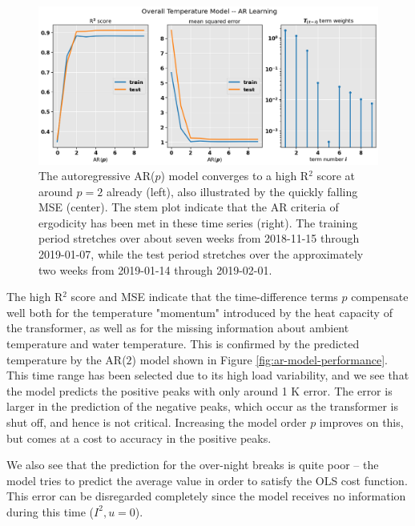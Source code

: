 \documentclass[]{article}
\begin{document}
\begin{figure}[!h]
	\centering
	\includegraphics[width=1\linewidth]{./figs/ar-model-learning.png}
	\caption{The autoregressive AR($p$) model converges to a high R$^2$ score at around $p = 2$ already (left), also illustrated by the quickly falling MSE (center). The stem plot indicate that the AR criteria of ergodicity has been met in these time series (right). The training period stretches over about seven weeks from 2018-11-15 through 2019-01-07, while the test period stretches over the approximately two weeks from 2019-01-14 through 2019-02-01.}
	\label{fig:ar-model-learning}
\end{figure}

The high R$^2$ score and MSE indicate that the time-difference terms $p$ compensate well both for the temperature "momentum" introduced by the heat capacity of the transformer, as well as for the missing information about ambient temperature and water temperature. This is confirmed by the predicted temperature by the AR($2$) model shown in Figure \ref{fig:ar-model-performance}. This time range has been selected due to its high load variability, and we see that the model predicts the positive peaks with only around 1 K error. The error is larger in the prediction of the negative peaks, which occur as the transformer is shut off, and hence is not critical. Increasing the model order $p$ improves on this, but comes at a cost to accuracy in the positive peaks.

We also see that the prediction for the over-night breaks is quite poor -- the model tries to predict the average value in order to satisfy the OLS cost function. This error can be disregarded completely since the model receives no information during this time ($I^2, u = 0$).
\end{document}
